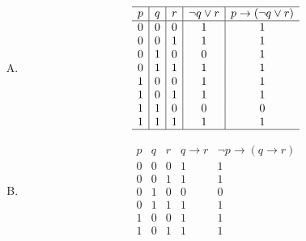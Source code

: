 {{        %
        \begin{practices}
            \begin{enumerate}[A.]
                \item
                {
                    \begin{table}[H]
                        \[
                            \begin{array}{c|c|c|c|c}
                                \hline
                                p & q & r & \neg q \vee r & p \rightarrow (\neg q \vee r) \\
                                \hline
                                0 & 0 & 0 & 1 & 1 \\
                                0 & 0 & 1 & 1 & 1 \\
                                0 & 1 & 0 & 0 & 1 \\
                                0 & 1 & 1 & 1 & 1 \\
                                1 & 0 & 0 & 1 & 1 \\
                                1 & 0 & 1 & 1 & 1 \\
                                1 & 1 & 0 & 0 & 0 \\
                                1 & 1 & 1 & 1 & 1 \\
                                \hline
                            \end{array}
                        \]
                    \end{table}
                }
                \item
                {
                    \begin{table}[H]
                        \[
                            \begin{array}{c|c|c|c|c}
                                \hline
                                p & q & r & q \rightarrow r & \neg p \rightarrow (q \rightarrow r) \\
                                \hline
                                0 & 0 & 0 & 1 & 1 \\
                                0 & 0 & 1 & 1 & 1 \\
                                0 & 1 & 0 & 0 & 0 \\
                                0 & 1 & 1 & 1 & 1 \\
                                1 & 0 & 0 & 1 & 1 \\
                                1 & 0 & 1 & 1 & 1 \\

\end{array}\]
\end{table}}
\end{enumerate}
\end{practices}}}
